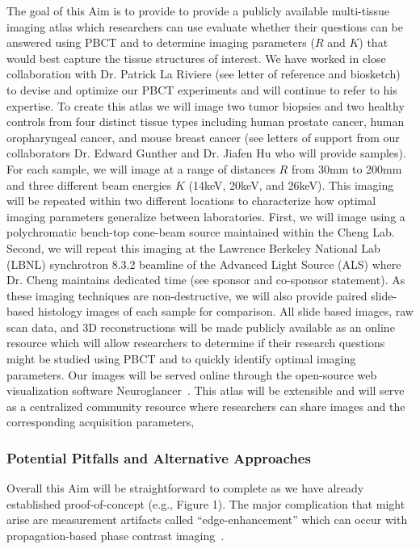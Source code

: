 \documentclass{NIHGrant}
\theoremstyle{theorem}
\begin{document}
The goal of this Aim is to provide to provide a publicly available multi-tissue
imaging atlas which researchers can use evaluate whether their questions
can be answered using PBCT and to determine imaging parameters (\(R\) and \(K\))
that would best capture the tissue structures of interest. We have worked in close collaboration with Dr. Patrick La Riviere (see letter of reference and biosketch) to devise and optimize our PBCT experiments and will continue to refer to his expertise. To create this atlas
we will image two tumor biopsies and two healthy controls from four distinct
tissue types including human prostate cancer, human oropharyngeal cancer, and mouse
breast cancer (see letters of support from our collaborators Dr. Edward Gunther and Dr. Jiafen Hu who will
provide samples). For each sample, we will image at a range of distances \(R\)
from 30mm to 200mm and three different beam energies \(K\) (14keV, 20keV, and
26keV). This imaging will be repeated within two different locations to
characterize how optimal imaging parameters generalize between laboratories.
First, we will image using a polychromatic bench-top cone-beam source maintained within the
Cheng Lab. Second, we will repeat this imaging at the Lawrence Berkeley National
Lab (LBNL) synchrotron 8.3.2 beamline of the Advanced Light Source (ALS) where Dr.
Cheng maintains dedicated time (see sponsor and co-sponsor statement). As these imaging
techniques are non-destructive, we will also provide paired slide-based
histology images of each sample for comparison. All slide based images, raw scan
data, and 3D reconstructions will be made publicly available as an online
resource which will allow researchers to determine if their research questions
might be studied using PBCT and to quickly identify optimal imaging parameters.
Our images will be served online through the open-source web visualization
software Neuroglancer~\cite{maitin-shepard_googleneuroglancer_2021}. This atlas will be extensible and will serve as a
centralized community resource where researchers can share images and the corresponding acquisition parameters,

\subsubsection*{Potential Pitfalls and Alternative Approaches}
Overall this Aim will be straightforward to complete as we have already
established proof-of-concept (e.g., Figure 1). The major complication that
might arise are measurement artifacts called ``edge-enhancement'' which can
occur with propagation-based phase contrast imaging~\cite{cheng_whole-animal_2011,ding_computational_2019}.
\end{document}
